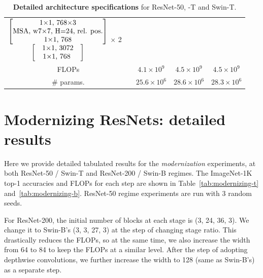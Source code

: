 \documentclass[10pt,twocolumn,letterpaper]{article}
\begin{document}
\begin{table}[t]
{\begin{tabular}{c|c|c|c|c}
\multirow{5}{*}{$\begin{matrix}\begin{bmatrix}\text{1$\times$1, 768$\times$3}\\\text{MSA, w7$\times$7, H=24, rel. pos.}\\\text{1$\times$1, 768}\end{bmatrix}\\\begin{bmatrix}\text{\quad1$\times$1, 3072\quad}\\\text{\quad1$\times$1, 768\ \quad}\end{bmatrix}\end{matrix}$  $\times$ 2} \\
& & & & \\
& & & & \\
& & & & \\
& & & & \\
\hline
\multicolumn{2}{c|}{FLOPs}
&
$4.1 \times 10^9$
&
$4.5 \times 10^9$
&
$4.5 \times 10^9$
\\
\hline
\multicolumn{2}{c|}{\# params.}
&
$25.6 \times 10^6$
&
$28.6 \times 10^6$
&
$28.3 \times 10^6$ \\
\hline

\end{tabular}
}
\normalsize
\caption{\textbf{Detailed architecture specifications} for ResNet-50, \cnn{}-T and Swin-T.}
\label{table:arch-spec}
\end{table}

\section{Modernizing ResNets: detailed results}
\label{sec:modernizing_result}
Here we provide detailed tabulated results for the \emph{modernization} experiments, at both ResNet-50 / Swin-T and ResNet-200 / Swin-B regimes. The ImageNet-1K top-1 accuracies and FLOPs for each step are shown in Table~\ref{tab:modernizing-t} and~\ref{tab:modernizing-b}. ResNet-50 regime experiments are run with 3 random seeds.

For ResNet-200, the initial number of blocks at each stage is (3, 24, 36, 3). We change it to Swin-B's (3, 3, 27, 3) at the step of changing stage ratio. This drastically reduces the FLOPs, so at the same time, we also increase the width from 64 to 84 to keep the FLOPs at a similar level. After the step of adopting depthwise convolutions, we further increase the width to 128 (same as Swin-B's) as a separate step. 
\end{document}
